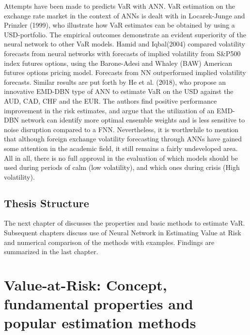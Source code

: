\documentclass[a4paper,11pt,oneside]{book}
\begin{document}
Attempts have been made to predicts VaR with ANN. VaR estimation on the exchange rate market in the context of ANNs is dealt with in
Locarek-Junge and Prinzler (1999), who illustrate how VaR estimates can be obtained
by using a USD-portfolio. The empirical outcomes demonstrate an evident superiority
of the neural network to other VaR models. Hamid and Iqbal(2004) compared volatility forecasts from neural networks with forecasts of implied volatility from S\&P500 index futures options, using the Barone-Adesi and Whaley (BAW) American futures options pricing model. Forecasts from NN outperformed implied volatility forecasts. Similar results are put forth by He et al.
(2018), who propose an innovative EMD-DBN type of ANN to estimate VaR on the
USD against the AUD, CAD, CHF and the EUR. The authors find positive
performance improvement in the risk estimates, and argue that the utilization of an
EMD-DBN network can identify more optimal ensemble weights and is less sensitive
to noise disruption compared to a FNN. Nevertheless, it is worthwhile to mention that although
foreign exchange volatility forecasting through ANNs have gained some attention in
the academic field, it still remains a fairly undeveloped area.
\newline\newline
All in all, there is no full approval in the evaluation of which models should be used during
periods of calm (low volatility), and which ones during crisis (High volatility).


\section{Thesis Structure}
The next chapter of discusses the properties and basic methods to estimate VaR. Subsequent chapters discuss use of Neural Network in Estimating Value at Risk and numerical comparison of the methods with examples. Findings are summarized in the last chapter.




\chapter{Value-at-Risk: Concept, fundamental properties and popular estimation
	methods}
\end{document}
